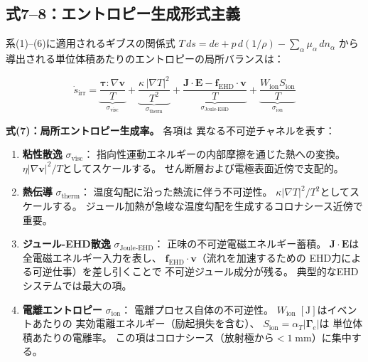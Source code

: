 \documentclass[12pt,twocolumn]{ltjsarticle}
\newcommand{\ee}{\mathbf{E}}
\newcommand{\jj}{\mathbf{J}}
\newcommand{\vv}{\mathbf{v}}
\newcommand{\ff}{\mathbf{f}}
\newcommand{\sdot}{\dot{s}_{\mathrm{irr}}}
\begin{document}
\subsection{式7--8：エントロピー生成形式主義}
\label{sec:entropy}

系(1)--(6)に適用されるギブスの関係式
$T\,ds = de + p\,d(1/\rho) - \sum_\alpha \mu_\alpha \,dn_\alpha$
から導出される単位体積あたりのエントロピーの局所バランスは：

\begin{equation}
\boxed{
  \sdot
  = \underbrace{\frac{\bm{\tau} : \nabla\vv}{T}}_{\sigma_{\mathrm{visc}}}
  + \underbrace{\frac{\kappa\,|\nabla T|^2}{T^2}}_{\sigma_{\mathrm{therm}}}
  + \underbrace{\frac{\jj \cdot \ee
    - \ff_{\mathrm{EHD}} \cdot \vv}{T}}_{\sigma_{\mathrm{Joule\text{-}EHD}}}
  + \underbrace{\frac{W_{\mathrm{ion}}
    S_{\mathrm{ion}}}{T}}_{\sigma_{\mathrm{ion}}}
}
\tag{7}
\label{eq:entropy_local}
\end{equation}

\noindent
\textbf{式(7)：局所エントロピー生成率。} 各項は
異なる不可逆チャネルを表す：

\begin{enumerate}
  \item \textbf{粘性散逸} $\sigma_{\mathrm{visc}}$：
    指向性運動エネルギーの内部摩擦を通じた熱への変換。
    $\eta |\nabla\vv|^2 / T$としてスケールする。
    せん断層および電極表面近傍で支配的。

  \item \textbf{熱伝導} $\sigma_{\mathrm{therm}}$：
    温度勾配に沿った熱流に伴う不可逆性。
    $\kappa |\nabla T|^2 / T^2$としてスケールする。
    ジュール加熱が急峻な温度勾配を生成するコロナシース近傍で重要。

  \item \textbf{ジュール-EHD散逸} $\sigma_{\mathrm{Joule\text{-}EHD}}$：
    正味の不可逆電磁エネルギー蓄積。
    $\jj \cdot \ee$は全電磁エネルギー入力を表し、
    $\ff_{\mathrm{EHD}} \cdot \vv$（流れを加速するための
    EHD力による可逆仕事）を差し引くことで
    不可逆ジュール成分が残る。
    典型的なEHDシステムでは最大の項。

  \item \textbf{電離エントロピー} $\sigma_{\mathrm{ion}}$：
    電離プロセス自体の不可逆性。
    $W_{\mathrm{ion}}\;[\mathrm{J}]$はイベントあたりの
    実効電離エネルギー（励起損失を含む）、
    $S_{\mathrm{ion}} = \alpha_T |\bm{\Gamma}_e|$は
    単位体積あたりの電離率。
    この項はコロナシース（放射極から$<1\;\mathrm{mm}$）に集中する。
\end{enumerate}
\end{document}
